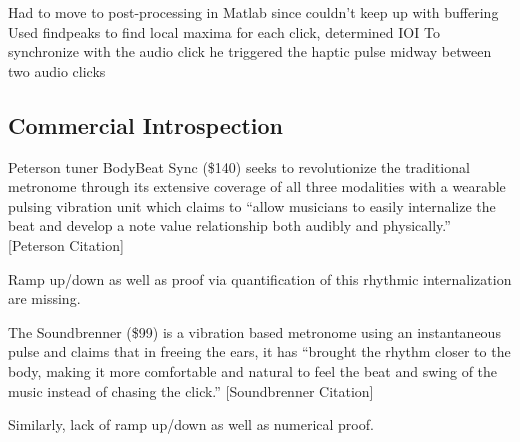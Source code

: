 Had to move to post-processing in Matlab since couldn’t keep up with buffering
Used findpeaks to find local maxima for each click, determined IOI
To synchronize with the audio click he triggered the haptic pulse midway between two audio clicks


\subsection{Commercial Introspection}
Peterson tuner BodyBeat Sync (\$140) seeks to revolutionize the traditional metronome through its extensive coverage of all three modalities with a wearable pulsing vibration unit which claims to “allow musicians to easily internalize the beat and develop a note value relationship both audibly and physically.” [Peterson Citation]

Ramp up/down as well as proof via quantification of this rhythmic internalization are missing.

The Soundbrenner (\$99) is a vibration based metronome using an instantaneous pulse and claims that in freeing the ears, it has “brought the rhythm closer to the body, making it more comfortable and natural to feel the beat and swing of the music instead of chasing the click.” [Soundbrenner Citation]

Similarly, lack of ramp up/down as well as numerical proof.
